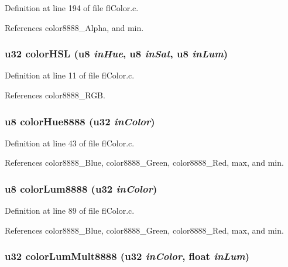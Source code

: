 Definition at line 194 of file fl\-Color.c.

References color8888\_\-Alpha, and min.
\subsubsection{\setlength{\rightskip}{0pt plus 5cm}u32 color\-HSL (u8 {\em in\-Hue}, u8 {\em in\-Sat}, u8 {\em in\-Lum})}\label{flColor_8c_1f1236cd3a557da2460a8ea749a1a281}




Definition at line 11 of file fl\-Color.c.

References color8888\_\-RGB.
\subsubsection{\setlength{\rightskip}{0pt plus 5cm}u8 color\-Hue8888 (u32 {\em in\-Color})}\label{flColor_8c_9b21668439ded2a1e473584fa56ee9a1}




Definition at line 43 of file fl\-Color.c.

References color8888\_\-Blue, color8888\_\-Green, color8888\_\-Red, max, and min.
\subsubsection{\setlength{\rightskip}{0pt plus 5cm}u8 color\-Lum8888 (u32 {\em in\-Color})}\label{flColor_8c_a8a43be1182590891faaf0c93d26e62f}




Definition at line 89 of file fl\-Color.c.

References color8888\_\-Blue, color8888\_\-Green, color8888\_\-Red, max, and min.
\subsubsection{\setlength{\rightskip}{0pt plus 5cm}u32 color\-Lum\-Mult8888 (u32 {\em in\-Color}, float {\em in\-Lum})}\label{flColor_8c_eabbaad667dc71427eb83782d1588762}





